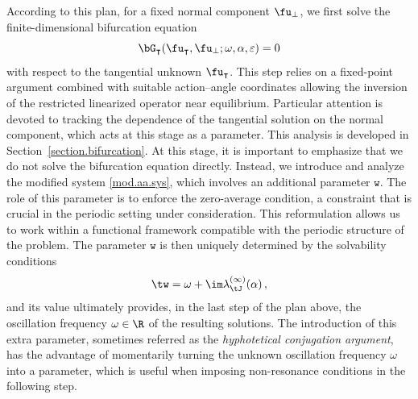 \documentclass[a4paper,reqno,10pt]{article}
\begin{document}
According to this plan,
for a fixed normal component \(\fu_{\perp}\), we first solve the finite-dimensional
bifurcation equation
\[
\bG_{\intercal}(\fu_{\intercal},\fu_{\perp};\omega,\alpha,\varepsilon)=0
\]
with respect to the tangential unknown \(\fu_{\intercal}\). This step relies on
a fixed-point argument combined with suitable action--angle coordinates allowing
the inversion of the restricted linearized operator near equilibrium. Particular
attention is devoted to tracking the dependence of the tangential solution on
the normal component, which acts at this stage as a parameter. This analysis is
developed in Section~\ref{section.bifurcation}. At this stage, it is important to emphasize that we do not solve the bifurcation equation directly. Instead, we introduce and analyze the modified system \eqref{mod.aa.sys}, which involves an additional parameter $\mathtt{w}$. The role of this parameter is to enforce the zero-average condition, a constraint that is crucial in the periodic setting under consideration. This reformulation allows us to work within a functional framework compatible with the periodic structure of the problem. The parameter $\mathtt{w}$ is then uniquely determined by the solvability conditions
\begin{equation}
    \tw = \omega  + \im \lambda_{\tJ}^{(\infty)}(\alpha) \,,
\end{equation}
and its value ultimately provides, in the last step of the plan above, the oscillation frequency $\omega\in\R$ of the resulting solutions. 
The introduction of this extra parameter, sometimes referred as the \textit{hyphotetical conjugation argument}, has the advantage of momentarily turning the unknown oscillation frequency $\omega$ into a parameter, which is useful when imposing non-resonance conditions in the following step.


\end{document}
